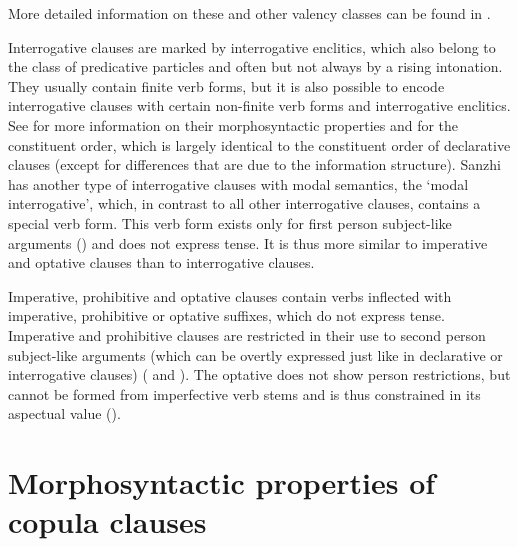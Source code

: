 More detailed information on these and other valency classes can be found in .

Interrogative clauses are marked by interrogative enclitics, which also belong to the class of predicative particles and often but not always by a rising intonation. They usually contain finite verb forms, but it is also possible to encode interrogative clauses with certain non-finite verb forms and interrogative enclitics. See  for more information on their morphosyntactic properties and  for the constituent order, which is largely identical to the constituent order of declarative clauses (except for differences that are due to the information structure). Sanzhi has another type of interrogative clauses with modal semantics, the `modal interrogative', which, in contrast to all other interrogative clauses, contains a special verb form. This verb form exists only for first person subject-like arguments () and does not express tense. It is thus more similar to imperative and optative clauses than to interrogative clauses. 

Imperative, prohibitive and optative clauses contain verbs inflected with imperative, prohibitive or optative suffixes, which do not express tense. Imperative and prohibitive clauses are restricted in their use to second person subject-like arguments (which can be overtly expressed just like in declarative or interrogative clauses) ( and ). The optative does not show person restrictions, but cannot be formed from imperfective verb stems and is thus constrained in its aspectual value ().




\section{Morphosyntactic properties of copula clauses}
\label{sec:copulaclauses}

